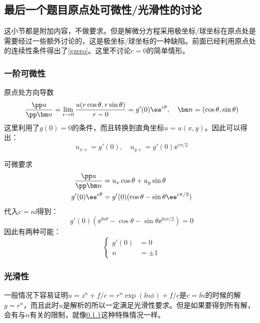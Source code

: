 \documentclass[a4paper,12pt]{article}
\begin{document}
\subsection{最后一个题目原点处可微性/光滑性的讨论}
这小节都是附加内容，不做要求。但是解微分方程采用极坐标/球坐标在原点处是需要经过一些额外讨论的，这是极坐标/球坐标的一种缺陷。前面已经利用原点处的连续性条件得出了\ref{gzero}。这里不讨论$c=0$的简单情形。
\subsubsection{一阶可微性}\label{1st}
原点处方向导数
\begin{equation}
\frac{\pp u}{\pp \bm n}=\lim_{r\to 0} \frac{u(r\cos\theta,r\sin\theta)}{r-0}=g'(0)\ee^{c\theta},\quad \bm n=(\cos\theta,\sin\theta)
\end{equation}
这里利用了$g(0)=0$的条件，而且转换到直角坐标$u=u(x,y)$。因此可以得出：
\begin{equation}
u_{x+}=g'(0), \quad u_{y+}=g'(0)\ee^{c\pi/2}
\end{equation}

可微要求
\begin{align}
 \frac{\pp u}{\pp \bm n}&=u_x\cos\theta +u_y\sin\theta \\
 g'(0)\ee^{c\theta}&=g'(0)(\cos\theta-\sin\theta\ee^{c\pi/2})
\end{align}
代入$c=n\ii$得到：
\begin{equation}
g'(0)(\ee^{\ii n\theta}-\cos\theta-\sin\theta\ee^{\ii n\pi/2})=0
\end{equation}
因此有两种可能：
\begin{equation}
\left\{
\begin{aligned}
 g'(0)&=0\\
 n&=\pm 1
\end{aligned}
\right.
\end{equation}
\subsubsection{光滑性}
一般情况下容易证明$u=z^n+f/c=r^n\exp(\ii n\phi)+f/c$是$c=\ii n$的时候的解$g=r^n$，而且此时$u$是解析的所以一定满足光滑性要求。但是如果要得到所有解，会有与$n$有关的限制，就像\ref{1st}这种特殊情况一样。

\end{document}
